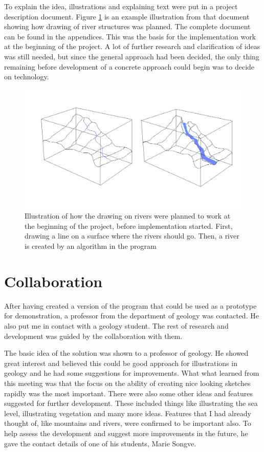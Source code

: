 \documentclass[a4paper,12pt]{report}
\begin{document}
To explain the idea, illustrations and explaining text were put in a project description document. Figure \ref{fig:riverDesription} is an example illustration from that document showing how drawing of river structures was planned. The complete document can be found in the appendices. This was the basis for the implementation work at the beginning of the project. A lot of further research and clarification of ideas was still needed, but since the general approach had been decided, the only thing remaining before development of a concrete approach could begin was to decide on technology.

\begin{figure}
 \includegraphics[width=\linewidth]{thesis/river.png}
 \caption{Illustration of how the drawing on rivers were planned to work at the beginning of the project, before implementation started. First, drawing a line on a surface where the rivers should go. Then, a river is created by an algorithm in the program}
 \label{fig:riverDesription}
\end{figure}


\section{Collaboration}
After having created a version of the program that could be used as a prototype for demonstration, a professor from the department of geology was contacted. He also put me in contact with a geology student. The rest of research and development was guided by the collaboration with them. 

The basic idea of the solution was shown to a professor of geology. He showed great interest and believed this could be good approach for illustrations in geology and he had some suggestions for improvements. What what learned from this meeting was that the focus on the ability of creating nice looking sketches rapidly was the most important. There were also some other ideas and features suggested for further development. These included things like illustrating the sea level, illustrating vegetation and many more ideas. Features that I had already thought of, like mountains and rivers, were confirmed to be important also. To help assess the development and suggest more improvements in the future, he gave the contact details of one of his students, Marie Songve.
\end{document}
